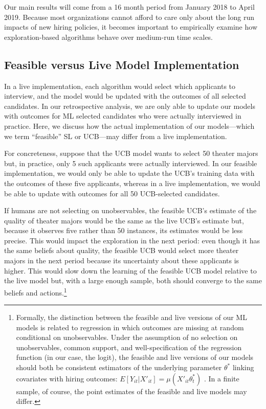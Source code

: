 \documentclass[crop,noquery,editorname,historyrev,nosurname,runningno,sepcount]{RESTUD}
\begin{document}
Our main results will come from a 16 month period from January 2018 to April 2019.  Because most organizations cannot afford to care only about the long run impacts of new hiring policies, it becomes important to empirically examine how exploration-based algorithms behave over medium-run time scales. 


\subsection{Feasible versus Live Model Implementation} \label{sec:feasible}

In a live implementation, each algorithm would select which applicants to interview, and the model would be updated with the outcomes of all selected candidates.   In our retrospective analysis, we are only able to update our models with outcomes for ML selected candidates who were actually interviewed in practice.  Here, we discuss how the actual implementation of our models---which we term ``feasible'' SL or UCB---may differ from a live implementation.

For concreteness, suppose that the UCB model wants to select 50 theater majors but, in practice, only 5 such applicants were actually interviewed.  In our feasible implementation, we would only be able to update the UCB's training data with the outcomes of these five applicants, whereas in a live implementation, we would be able to update with outcomes for all 50 UCB-selected candidates.

If humans are not selecting on unobservables, the feasible UCB's estimate of the quality of theater majors would be the same as the live UCB's estimate but, because it observes five rather than 50 instances, its estimates would be less precise.  This would impact the exploration in the next period: even though it has the same beliefs about quality, the feasible UCB would select more theater majors in the next period because its uncertainty about these applicants is higher.  This would slow down the learning of the feasible UCB model relative to the live model but, with a large enough sample, both should converge to the same beliefs and actions.\footnote{Formally, the distinction between the feasible and live versions of our ML models is related to regression in which outcomes are missing at random conditional on unobservables.  Under the assumption of no selection on unobservables, common support, and well-specification of the regression function (in our case, the logit), the feasible and live versions of our models should both be consistent estimators of the underlying parameter $\theta^*$ linking covariates with hiring outcomes: $E[Y_{it} | X'_{it}]= \mu(X'_{it}\theta_t^*)$ \citep{wangetal2010, robinsetal1995}.  In a finite sample, of course, the point estimates of the feasible and live models may differ.}
\end{document}
